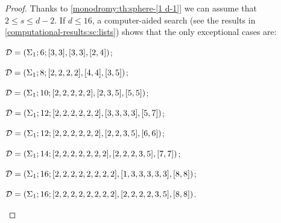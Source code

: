 \begin{proof}
Thanks to \cref{monodromy:th:sphere-[1 d-1]} we can assume that $2\le s\le d-2$. If $d\le 16$, a computer-aided search (see the results in \cref{computational-results:sc:lists}) shows that the only exceptional cases are:
\begin{enumarabic}
\item $\mathcal{D}=(\Sigma_{1};6;[3, 3],[3, 3],[2, 4])$;
\item $\mathcal{D}=(\Sigma_{1};8;[2, 2, 2, 2],[4, 4],[3, 5])$;
\item $\mathcal{D}=(\Sigma_{1};10;[2, 2, 2, 2, 2],[2, 3, 5],[5, 5])$;
\item $\mathcal{D}=(\Sigma_{1};12;[2, 2, 2, 2, 2, 2],[3, 3, 3, 3],[5, 7])$;
\item $\mathcal{D}=(\Sigma_{1};12;[2, 2, 2, 2, 2, 2],[2, 2, 3, 5],[6, 6])$;
\item $\mathcal{D}=(\Sigma_{1};14;[2, 2, 2, 2, 2, 2, 2],[2, 2, 2, 3, 5],[7, 7])$;
\item $\mathcal{D}=(\Sigma_{1};16;[2, 2, 2, 2, 2, 2, 2, 2],[1, 3, 3, 3, 3, 3],[8, 8])$;
\item $\mathcal{D}=(\Sigma_{1};16;[2, 2, 2, 2, 2, 2, 2, 2],[2, 2, 2, 2, 3, 5],[8, 8])$.


\end{enumarabic}
\end{proof}
